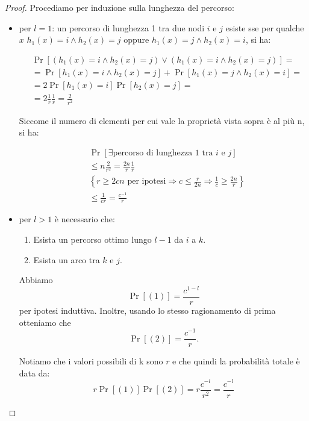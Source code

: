 \begin{proof}
    Procediamo per induzione sulla lunghezza del percorso:
    \begin{itemize}
    \item per $l = 1$: un percorso di lunghezza 1 tra due nodi $i$ e $j$ esiste
    sse per qualche $x$ $h_1(x) = i \land h_2(x) = j$ oppure $h_1(x) = j \land
    h_2(x) = i$, si ha:
    
    \begin{align}
        &\Pr\left[(h_1(x) = i \land h_2(x) = j) \lor (h_1(x) = i \land h_2(x) = j) \right] = \nonumber \\
        &= \Pr\left[h_1(x) = i \land h_2(x) = j\right] + \Pr\left[h_1(x) = j \land h_2(x) = i\right] = \nonumber \\
        &= 2 \Pr\left[h_1(x) = i\right]\Pr\left[h_2(x) = j\right] = \nonumber \\
        &= 2 \frac{1}{r} \frac{1}{r} = \frac{2}{r^2} \nonumber
    \end{align}

    Siccome il numero di elementi per cui vale la proprietà vista sopra è al
    più n, si ha:

    \begin{align}
        & \Pr\left[\exists \mbox{percorso di lunghezza 1 tra $i$ e $j$}\right] \nonumber \\
        &\le n \frac{2}{r^2} = \frac{2n}{r} \frac{1}{r} \nonumber \\
        &\left\{r \ge 2cn \mbox{ per ipotesi} \Rightarrow c \le \frac{r}{2n}
            \Rightarrow \frac{1}{c} \ge \frac{2n}{r} \right\} \nonumber \\
        &\le \frac {1}{cr} = \frac{c^{-1}}{r} \nonumber
    \end{align}

    \item per $l > 1$ è necessario che:
        \begin{enumerate}
            \item Esista un percorso ottimo lungo $l-1$ da $i$ a $k$.
            \item Esista un arco tra $k$ e $j$.
        \end{enumerate}
        Abbiamo
            \[\Pr[(1)] = \frac{c^{1-l}}{r}\]
        per ipotesi induttiva. Inoltre, usando lo stesso ragionamento di prima
        otteniamo che
            \[\Pr[(2)]= \frac{c^{-1}}{r}.\]

        Notiamo che i valori possibili di k sono $r$ e che quindi la probabilità
        totale è data da:
        \[r \Pr[(1)]\Pr[(2)] = r\frac{c^{-l}}{r^2} = \frac{c^{-l}}{r}\]
    \end{itemize}
\end{proof}

